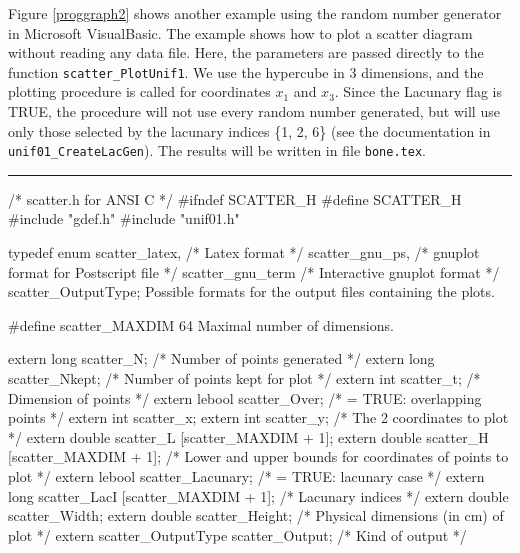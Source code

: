 Figure \ref{proggraph2} shows another example using the 
random number generator in Microsoft VisualBasic. The example
shows how to plot a scatter diagram without reading any data file.
Here, the parameters are passed directly to the function 
{\tt scatter\_PlotUnif1}.
We use the hypercube in 3 dimensions, and the 
 plotting procedure is called for coordinates $x_1$ and $x_{3}$.
 Since the Lacunary flag is TRUE,
the procedure will not use every random number generated, but will
use only those selected by the lacunary indices \{1, 2, 6\}  
(see the documentation in {\tt unif01\_CreateLacGen}).
The results will be written in file {\tt bone.tex}.

\vspace{10mm}
\bigskip
\hrule
\code
\hide
/* scatter.h  for ANSI C */
#ifndef SCATTER_H
#define SCATTER_H
\endhide
#include "gdef.h"
#include "unif01.h"
\endcode



\code

typedef enum {
   scatter_latex,                 /* Latex format */
   scatter_gnu_ps,                /* gnuplot format for Postscript file */   
   scatter_gnu_term               /* Interactive gnuplot format */
   } scatter_OutputType;
\endcode
 \tab
  Possible formats for the output files containing the plots.
 \endtab


\code

#define scatter_MAXDIM 64
\endcode
 \tab
  Maximal number of dimensions.
 \endtab

\ifdetailed  %

\code

extern long scatter_N;             /* Number of points generated */
extern long scatter_Nkept;         /* Number of points kept for plot */
extern int scatter_t;              /* Dimension of points */
extern lebool scatter_Over;        /* = TRUE: overlapping points */
extern int scatter_x;
extern int scatter_y;              /* The 2 coordinates to plot */
extern double scatter_L [scatter_MAXDIM + 1];
extern double scatter_H [scatter_MAXDIM + 1];
                                   /* Lower and upper bounds for coordinates
                                      of points to plot */
\endcode
\code
extern lebool scatter_Lacunary;    /* = TRUE: lacunary case */
extern long scatter_LacI [scatter_MAXDIM + 1];  /* Lacunary indices */
extern double scatter_Width;
extern double scatter_Height;      /* Physical dimensions (in cm) of plot */
extern scatter_OutputType scatter_Output;       /* Kind of output */
\endcode


